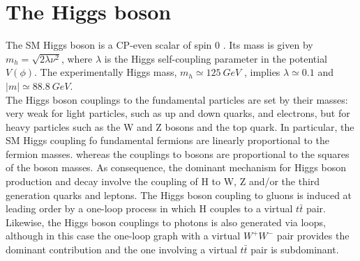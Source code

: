 \section{The Higgs boson}
The SM Higgs boson is a CP-even scalar of spin 0 \cite{PDG}. Its mass is given by $m_{h} = \sqrt{2\lambda\nu^{2}}$, where $\lambda$ is the Higgs self-coupling parameter in the potential $V(\phi)$. The experimentally Higgs mass, $m_{h} \simeq 125\ GeV$ \cite{ALTAS_H}\cite{CMS_H}, implies $\lambda \simeq 0.1$ and $|m| \simeq 88.8\ GeV$. \\
The Higgs boson couplings to the fundamental particles are set by their masses: very weak for light particles, such as up and down quarks, and electrons, but for heavy particles such as the W and Z bosons and the top quark. In particular, the SM Higgs coupling fo fundamental fermions are linearly proportional to the fermion masses. whereas the couplings to bosons are proportional to the squares of the boson masses. As consequence, the dominant mechanism for Higgs boson production and decay involve the coupling of H to W, Z and/or the third generation quarks and leptons. The Higgs boson coupling to  gluons is induced at leading order by a one-loop process in which H couples to a virtual $t\bar{t}$ pair. Likewise, the Higgs boson couplings to photons is also generated via loops, although in this case the one-loop graph with a virtual $W^{+}W^{-}$ pair provides the dominant contribution and the one involving a virtual $t\bar{t}$ pair is subdominant. \\

